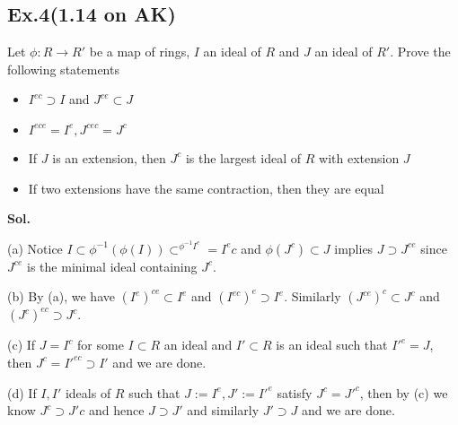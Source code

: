 \documentclass[lang=en,11pt,a4paper,citestyle =authoryear]{elegantpaper}
\begin{document}
\subsection*{Ex.4(1.14 on AK)} 
Let $\phi:R\to R'$ be a map of rings, $I$ an ideal of $R$ and $J$ an ideal of $R'$. Prove the following statements
\begin{itemize}
    \item $I^{ec}\supset I$ and $J^{ce}\subset J$
    \item $I^{ece} = I^e, J^{cec} = J^c$
    \item If $J$ is an extension, then $J^c$ is the largest ideal of $R$ with extension $J$
    \item If two extensions have the same contraction, then they are equal
\end{itemize}
\vspace{0.5em}
\textbf{Sol.} \par
(a) Notice $I\subset \phi^{-1}(\phi(I))\subset^{\phi^{-1}I^e} = I^ec$ and $\phi(J^c) \subset J$ implies $J \supset J^{ce}$ since $J^{ce}$ is the minimal ideal containing $J^{c}$.\par
(b) By (a), we have $(I^{e})^{ce} \subset I^e$ and $(I^{ec})^e \supset I^e$. Similarly $(J^{ce})^c  \subset J^c$ and $(J^c)^{ec} \supset J^c$.\par
(c) If $J = I^c$ for some $I\subset R$ an ideal and $I'\subset R$ is an ideal such that $I'^e = J$, then $J^c = I'^{ec} \supset I'$ and we are done.\par
(d) If $I,I'$ ideals of $R$ such that $J:= I^e, J':= I'^e$ satisfy $J^c = J'^c$, then by (c) we know $J^c \supset J'c$ and hence $J\supset J'$ and similarly $J'\supset J$ and we are done.
\par 
\vspace{0.5em}
\end{document}

